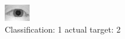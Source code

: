 \begin{figure}[h!]
\begin{center}
\includegraphics[width=0.60\columnwidth]{figures/ID907_class_1_target_2.png}
\end{center}
\caption{ Classification: 1 actual target: 2}
\label{fig:ID907_class_1_target_2}
\end{figure}
